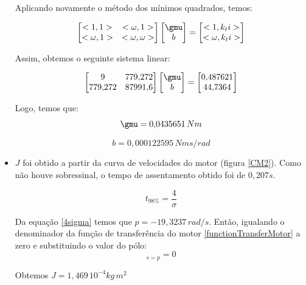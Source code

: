 \documentclass[]{politex}
\begin{document}
\begin{itemize}
Aplicando novamente o método dos mínimos quadrados, temos:

\begin{equation}
\begin{bmatrix}
<1, 1> & <\omega, 1>\\
<\omega, 1> & <\omega, \omega>
\end{bmatrix}
\begin{bmatrix}
\gmu\\
b
\end{bmatrix}= 
\begin{bmatrix}
<1, k_{t} i >\\
<\omega, k_{t} i >
\end{bmatrix}
\end{equation}

Assim, obtemos o seguinte sistema linear:

\begin{equation}
\begin{bmatrix}
9 & 779{,}272\\
779{,}272 & 87991{,}6
\end{bmatrix}
\begin{bmatrix}
\gmu\\
b
\end{bmatrix}= 
\begin{bmatrix}
0{,}487621\\
44{,}7364
\end{bmatrix}
\end{equation}

Logo, temos que: 
\begin{equation}
\gmu = 0{,}0435651 \, Nm
\end{equation}

\begin{equation}
b = 0{,}000122595 \, Nm s/rad
\end{equation}

\item $J$ foi obtido a partir da curva de velocidades do motor (figura \ref{CM2}). Como não houve sobressinal, o tempo de assentamento obtido foi de $0{,}207 s$.

\begin{equation}
\label{4sigma}
 t_{98\%} =\frac{4}{\sigma}
\end{equation}

Da equação \eqref{4sigma} temos que $p= -19{,}3237  \, rad/s$.
Então, igualando o denominador da função de transferência do motor \eqref{functionTransferMotor}  a zero e substituindo o valor do pólo:
\begin{equation}
[(L s + R) (J s + b) + k_t k_e]_{s = p} = 0
\end{equation}

Obtemos $J = 1{,}469 \, 10^{-4} kg \, m^2 $

\end{itemize}
\end{document}
